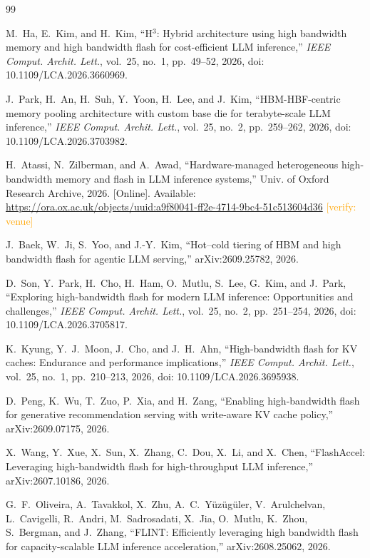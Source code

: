 \documentclass[conference,10pt]{IEEEtran}
\newcommand{\verify}[1]{\textcolor{orange}{[verify: #1]}}
\begin{document}
\begin{thebibliography}{99}

M.~Ha, E.~Kim, and H.~Kim, ``{H$^3$}: Hybrid architecture using high bandwidth
memory and high bandwidth flash for cost-efficient {LLM} inference,''
\emph{IEEE Comput. Archit. Lett.}, vol.~25, no.~1, pp.~49--52, 2026,
doi: 10.1109/LCA.2026.3660969.

J.~Park, H.~An, H.~Suh, Y.~Yoon, H.~Lee, and J.~Kim, ``{HBM-HBF}-centric memory
pooling architecture with custom base die for terabyte-scale {LLM} inference,''
\emph{IEEE Comput. Archit. Lett.}, vol.~25, no.~2, pp.~259--262, 2026,
doi: 10.1109/LCA.2026.3703982.

H.~Atassi, N.~Zilberman, and A.~Awad, ``Hardware-managed heterogeneous
high-bandwidth memory and flash in {LLM} inference systems,'' Univ. of Oxford
Research Archive, 2026. [Online]. Available:
\url{https://ora.ox.ac.uk/objects/uuid:a9f80041-ff2e-4714-9bc4-51c513604d36}
\verify{venue}

J.~Baek, W.~Ji, S.~Yoo, and J.-Y.~Kim, ``Hot--cold tiering of {HBM} and high
bandwidth flash for agentic {LLM} serving,'' arXiv:2609.25782, 2026.

D.~Son, Y.~Park, H.~Cho, H.~Ham, O.~Mutlu, S.~Lee, G.~Kim, and J.~Park,
``Exploring high-bandwidth flash for modern {LLM} inference: Opportunities and
challenges,'' \emph{IEEE Comput. Archit. Lett.}, vol.~25, no.~2, pp.~251--254,
2026, doi: 10.1109/LCA.2026.3705817.

K.~Kyung, Y.~J.~Moon, J.~Cho, and J.~H.~Ahn, ``High-bandwidth flash for {KV}
caches: Endurance and performance implications,'' \emph{IEEE Comput. Archit.
Lett.}, vol.~25, no.~1, pp.~210--213, 2026, doi: 10.1109/LCA.2026.3695938.

D.~Peng, K.~Wu, T.~Zuo, P.~Xia, and H.~Zang, ``Enabling high-bandwidth flash
for generative recommendation serving with write-aware {KV} cache policy,''
arXiv:2609.07175, 2026.

X.~Wang, Y.~Xue, X.~Sun, X.~Zhang, C.~Dou, X.~Li, and X.~Chen, ``{FlashAccel}:
Leveraging high-bandwidth flash for high-throughput {LLM} inference,''
arXiv:2607.10186, 2026.

G.~F.~Oliveira, A.~Tavakkol, X.~Zhu, A.~C.~Y{\"u}z{\"u}g{\"u}ler,
V.~Arulchelvan, L.~Cavigelli, R.~Andri, M.~Sadrosadati, X.~Jia, O.~Mutlu,
K.~Zhou, S.~Bergman, and J.~Zhang, ``{FLINT}: Efficiently leveraging high
bandwidth flash for capacity-scalable {LLM} inference acceleration,''
arXiv:2608.25062, 2026.


\end{thebibliography}
\end{document}
